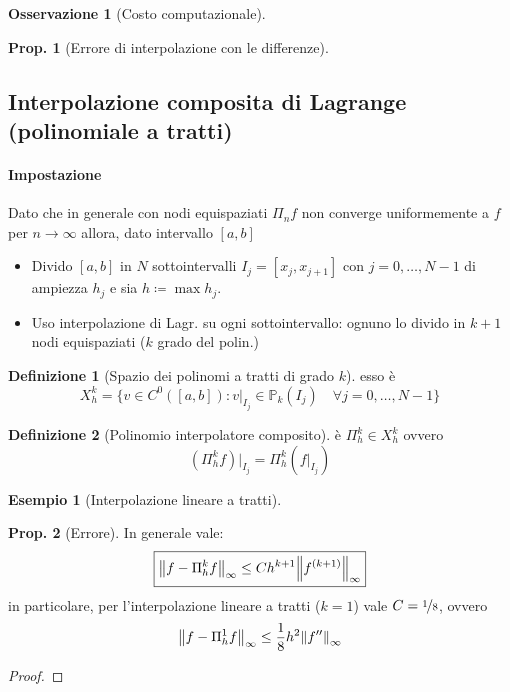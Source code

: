 \documentclass[a4paper,10pt]{article}
\theoremstyle{definition}
\theoremstyle{indentdefinition}
\newtheorem{defn}{Definizione}[section]
\theoremstyle{indenttheorem}
\newtheorem{prop}{Prop.}
\theoremstyle{myremark}
\newtheorem*{rem*}{Osservazione}
\newtheorem{example*}{Esempio}
\theoremstyle{indentgeneral}
\theoremstyle{plain}
\theoremstyle{plain}
\begin{document}
\begin{rem*}[Costo computazionale]
\end{rem*}
\begin{prop}[Errore di interpolazione con le differenze] 
    
\end{prop}

\subsection{Interpolazione composita di Lagrange (polinomiale a tratti)}
\paragraph{Impostazione}  Dato che in generale con nodi equispaziati $\Pi_nf$ non converge uniformemente a $f$ per $n\to\infty$ allora, dato intervallo $[a,b]$
\begin{itemize}
\item Divido $[a,b]$ in $N$ sottointervalli $I_j=[x_j,x_{j+1}]$ con $j=0,\dots, N-1$ di ampiezza $h_j$ e sia $h\coloneqq \max h_j$.
\item Uso interpolazione di Lagr. su ogni sottointervallo: ognuno lo divido in $k+1$ nodi equispaziati ($k$ grado del polin.)
\end{itemize}
\begin{defn}[Spazio dei polinomi a tratti di grado $k$]
    esso è 
    $$X_h^k=\{v\in C^0([a,b]): v|_{I_j}\in\mathbb{P}_k(I_j)\quad\forall j=0,\dots, N-1\}$$
\end{defn}

\begin{defn}[Polinomio interpolatore composito]
    è $\Pi_h^k\in X_h^k$ ovvero
    $$\left(\Pi_h^kf\right)|_{I_j}=\Pi_h^k\left(f|_{I_j}\right)$$
\end{defn}

\begin{example*}[Interpolazione lineare a tratti]
    
\end{example*}

\begin{prop}[Errore] In generale vale:
    $$\boxed{\norm{f-\Pi_h^kf}_\infty\le Ch^{k+1}\norm{f^{(k+1)}}_\infty}$$
    in particolare, per l'interpolazione lineare a tratti ($k=1$) vale $C=\nicefrac{1}{8}$, ovvero
    $$\norm{f-\Pi_h^1f}_\infty\le \frac{1}{8}h^2\norm{f''}_\infty$$
\end{prop}
\begin{proof}
\end{proof}
\end{document}

